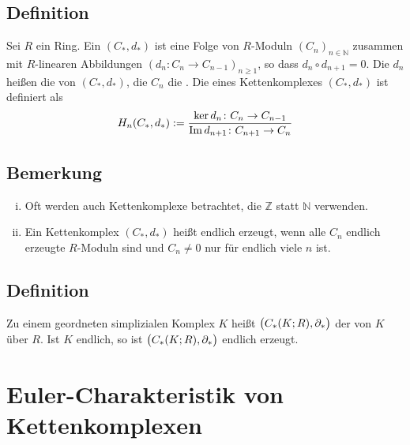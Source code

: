 
\subsection[Definition: $R$-Kettenkomplex, $n$-te Homologie eines $R$-Kettenkomplexes]{Definition} %
\label{sub:312}
Sei $R$ ein Ring. Ein  $(C_*, d_*)$ ist eine Folge von $R$-Moduln $(C_n)_{n \in \mathds{N}}$ zusammen mit $R$-linearen Abbildungen 
$(d_n \colon C_n \to C_{n-1})_{n \ge 1}$, so dass $d_n \circ d_{n+1} = 0$. Die $d_n$ heißen die  von $(C_*,d_*)$, die $C_n$ die .
Die  eines Kettenkomplexes $(C_*,d_*)$ ist definiert als
\[
	H_n(C_*, d_*) := \frac{\ker d_n \colon C_n \to C_{n-1}}{\im d_{n+1} \colon C_{n+1} \to C_n} 
\]

\subsection[Bemerkungen zu Kettenkomplexen]{Bemerkung} %
\label{sub:313}
\begin{enumerate}[(i)]
	\item Oft werden auch Kettenkomplexe betrachtet, die $\mathds{Z}$ statt $\mathds{N}$ verwenden.
	\item Ein Kettenkomplex $(C_*,d_*)$ heißt endlich erzeugt, wenn alle $C_n$ endlich erzeugte $R$-Moduln sind und $C_n \not= 0$ nur für endlich viele $n$ ist.
\end{enumerate}

\subsection[Definition: Simplizialer Kettenkomplex]{Definition} %
\label{sub:314}
Zu einem geordneten simplizialen Komplex $K$ heißt $\enbrace[\big]{C_*(K;R), \partial_*}$ der  von $K$ über 
$R$. 
Ist $K$ endlich, so ist $\enbrace[\big]{C_*(K;R), \partial_*}$ endlich erzeugt.
\newpage

\section{Euler-Charakteristik von Kettenkomplexen} %
\label{sec:4}

